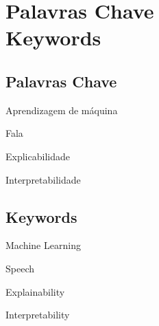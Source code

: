 \chapter*{Palavras Chave \\ Keywords}
\thispagestyle{empty}

\section*{Palavras Chave}
{\large %

\noindent Aprendizagem de máquina

\noindent Fala

\noindent Explicabilidade

\noindent Interpretabilidade

}

\section*{Keywords}

{\large %

\noindent Machine Learning

\noindent Speech

\noindent Explainability

\noindent Interpretability

}

\vfill

\cleardoublepage



\pagestyle{plain}



\def\contentsname{Table of Contents}
\tableofcontents
\newpage

\listoffigures
\newpage

\listoftables

\cleardoublepage


